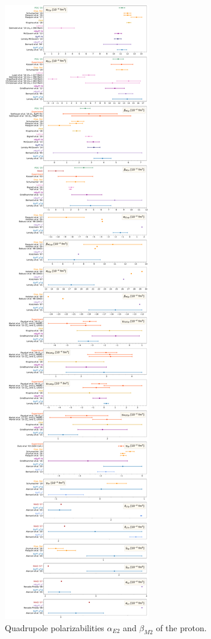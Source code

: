 \documentclass[preprints,review,accept,moreauthors,pdftex]{Definitions/mdpi}
\def\al{\alpha}
\def\be{\beta}
\begin{document}
\begin{figure}[t]
\centering
\includegraphics[width=\columnwidth]{Figures/QuadrupolePol.pdf}
\caption{Quadrupole polarizabilities $\al_{E2}$ and $\be_{M2}$ of the proton. \label{QuadrupolePol}}
\end{figure} 
\end{document}

